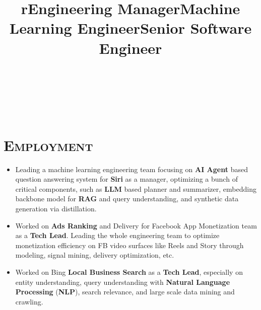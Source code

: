 \begin{resume}
\begin{formatb}
  \title{r}\\
  \\
  \body\\
\end{formatb}

\vspace*{-22pt}
\section{\textsc{Employment}}

\title{Engineering Manager}
\begin{position}
\vspace*{-8pt}
\begin{itemize}
\item Leading a machine learning engineering team focusing on \textbf{AI Agent} based question answering system for \textbf{Siri} as a manager, optimizing a bunch of critical components, such as \textbf{LLM} based planner and summarizer, embedding backbone model for \textbf{RAG} and query understanding, and synthetic data generation via distillation.
\end{itemize} 
\end{position}

\title{Machine Learning Engineer}
\begin{position}
\vspace*{-8pt}
\begin{itemize}
\item Worked on \textbf{Ads Ranking} and Delivery for Facebook App Monetization team as a \textbf{Tech Lead}. Leading the whole engineering team to optimize monetization efficiency on FB video surfaces like Reels and Story through modeling, signal mining, delivery optimization, etc.
\end{itemize} 
\end{position}

\title{Senior Software Engineer}
\begin{position}
\vspace*{-8pt}
\begin{itemize}
\item Worked on Bing \textbf{Local Business Search} as a \textbf{Tech Lead}, especially on entity understanding, query understanding with \textbf{Natural Language Processing} (\textbf{NLP}), search relevance, and large scale data mining and crawling.
\end{itemize} 
\end{position}


\end{resume}
